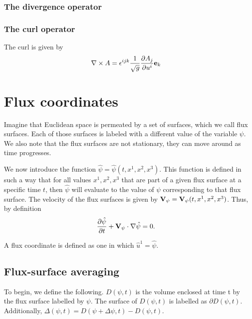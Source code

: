 \documentclass[11pt]{article}
\begin{document}
\subsubsection{The divergence operator}

\subsubsection{The curl operator}
The curl is given by
\begin{equation}
    \nabla \times A = \epsilon^{ijk} \frac{1}{\sqrt{g}} \frac{\partial A_j}{\partial u^i} \mathbf{e}_k
\end{equation}

\section{Flux coordinates}
Imagine that Euclidean space is permeated by a set of surfaces, which we call flux surfaces. Each of those surfaces is labeled with a different value of the variable $\psi$. We also note that the flux surfaces are not stationary, they can move around as time progresses.

We now introduce the function $\hat{\psi} = \hat{\psi}(t,x^1,x^2,x^3)$. This function is defined in such a way that for all values $x^1,x^2,x^3$ that are part of a given flux surface at a specific time $t$, then $\hat{\psi}$ will evaluate to the value of $\psi$ corresponding to that flux surface. The velocity of the flux surfaces is given by $\mathbf{V}_\psi = \mathbf{V}_\psi(t,x^1,x^2,x^3)$. Thus, by definition
\begin{equation}
\label{eq:cons_flux_surf}
    \frac{\partial \hat{\psi}}{\partial t} + \mathbf{V}_\psi \cdot \nabla \hat{\psi} = 0.
\end{equation}

A flux coordinate is defined as one in which $\hat{u}^1 = \hat{\psi}$.


\subsection{Flux-surface averaging}
To begin, we define the following. $D(\psi,t)$ is the volume enclosed at time t by the flux surface labelled by $\psi$. The surface of $D(\psi,t)$ is labelled as $\partial D(\psi,t)$. Additionally, $\Delta(\psi,t) = D(\psi + \Delta \psi,t) - D(\psi,t)$.
\end{document}
